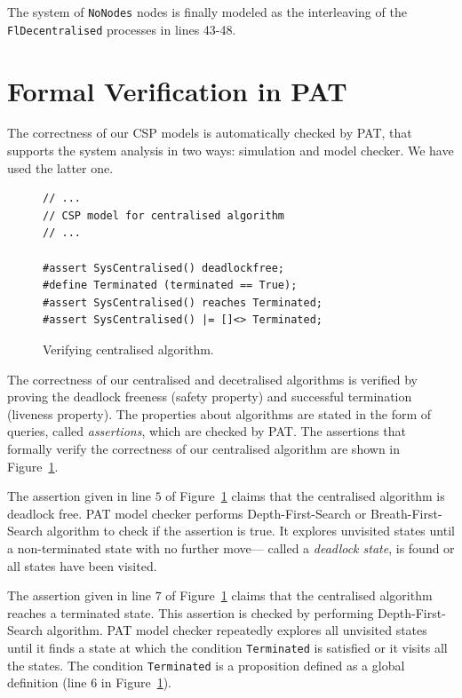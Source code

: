 \documentclass[runningheads]{llncs}
\begin{document}
The system of \lstinline{NoNodes} nodes is finally modeled as the interleaving of the
 \lstinline{FlDecentralised} processes in lines 43-48.
 
\section{Formal Verification in PAT}\label{sec: verification}

The correctness of our CSP models is automatically checked by PAT, that supports the system analysis in two ways: simulation and model checker.  We have used the latter one. %

\begin{figure}[t]
\begin{lstlisting}[frame=single]
// ...
// CSP model for centralised algorithm
// ...

#assert SysCentralised() deadlockfree;
#define Terminated (terminated == True);
#assert SysCentralised() reaches Terminated;
#assert SysCentralised() |= []<> Terminated;
\end{lstlisting}
\caption{Verifying centralised algorithm.}
\label{fig:verfying_centralized}
\end{figure}

The correctness of our centralised and decetralised algorithms is verified by proving the deadlock freeness (safety property) and successful termination (liveness property). The properties about algorithms are stated in the form of queries, called {\em assertions}, which are checked by PAT.  The assertions that formally verify the correctness of our centralised algorithm are shown in Figure~\ref{fig:verfying_centralized}.  


The assertion  %
 given in line $5$ of  Figure~\ref{fig:verfying_centralized} claims that the centralised algorithm is deadlock free. PAT model checker performs Depth-First-Search or Breath-First-Search algorithm to check if the assertion is true. It explores unvisited states until a non-terminated state with no further move---%
called a \emph{deadlock state}, is found or all states have been visited. 

The assertion %
given in line $7$ of Figure~\ref{fig:verfying_centralized} claims that the centralised algorithm reaches a terminated state. This assertion is checked by performing Depth-First-Search algorithm. PAT model checker repeatedly explores all unvisited states until it finds a state at which the condition \lstinline{Terminated} is satisfied or  it visits all the states. The condition \lstinline{Terminated} is a proposition defined as a global definition (line $6$ in Figure~\ref{fig:verfying_centralized}). 
\end{document}
